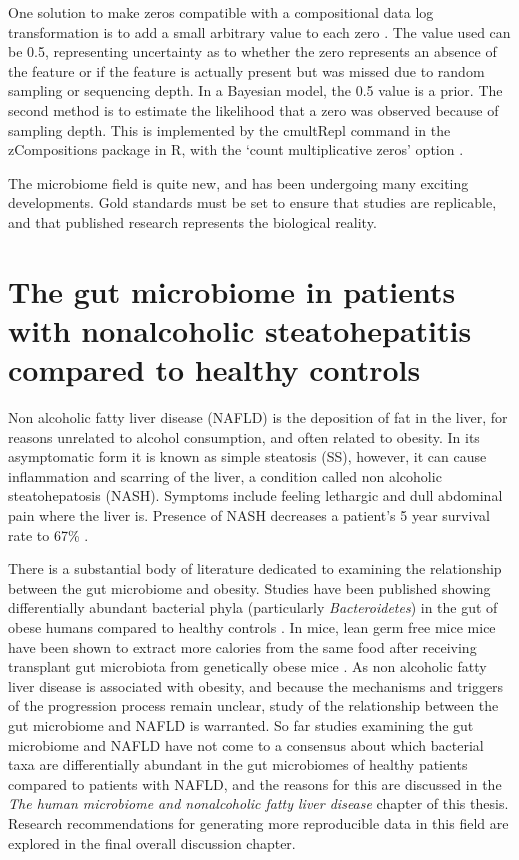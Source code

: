 One solution to make zeros compatible with a compositional data log transformation is to add a small arbitrary value to each zero \cite{aitchison1982statistical}. The value used can be 0.5, representing uncertainty as to whether the zero represents an absence of the feature or if the feature is actually present but was missed due to random sampling or sequencing depth. In a Bayesian model, the 0.5 value is a prior. The second method is to estimate the likelihood that a zero was observed because of sampling depth. This is implemented by the cmultRepl command in the zCompositions package in R, with the `count multiplicative zeros' option \cite{palarea2015zcompositions}.

The microbiome field is quite new, and has been undergoing many exciting developments. Gold standards must be set to ensure that studies are replicable, and that published research represents the biological reality.

\section{The gut microbiome in patients with nonalcoholic steatohepatitis compared to healthy controls}

Non alcoholic fatty liver disease (NAFLD) is the deposition of fat in the liver, for reasons unrelated to alcohol consumption, and often related to obesity. In its asymptomatic form it is known as simple steatosis (SS), however, it can cause inflammation and scarring of the liver, a condition called non alcoholic steatohepatosis (NASH). Symptoms include feeling lethargic and dull abdominal pain where the liver is. Presence of NASH decreases a patient's 5 year survival rate to 67\% \cite{propst1995prognosis}.

There is a substantial body of literature dedicated to examining the relationship between the gut microbiome and obesity. Studies have been published showing differentially abundant bacterial phyla (particularly \textit{Bacteroidetes}) in the gut of obese humans compared to healthy controls \cite{turnbaugh2009core} \cite{ley2006microbial}. In mice, lean germ free mice mice have been shown to extract more calories from the same food after receiving transplant gut microbiota from genetically obese mice \cite{turnbaugh2006obesity}. As non alcoholic fatty liver disease is associated with obesity, and because the mechanisms and triggers of the progression process remain unclear, study of the relationship between the gut microbiome and NAFLD is warranted. So far studies examining the gut microbiome and NAFLD \cite{wong2013molecular} \cite{zhu2013characterization} \cite{jiang2015dysbiosis} \cite{raman2013fecal} \cite{boursier2016severity} have not come to a consensus about which bacterial taxa are differentially abundant in the gut microbiomes of healthy patients compared to patients with NAFLD, and the reasons for this are discussed in the \textit{The human microbiome and nonalcoholic fatty liver disease} chapter of this thesis. Research recommendations for generating more reproducible data in this field are explored in the final overall discussion chapter.

